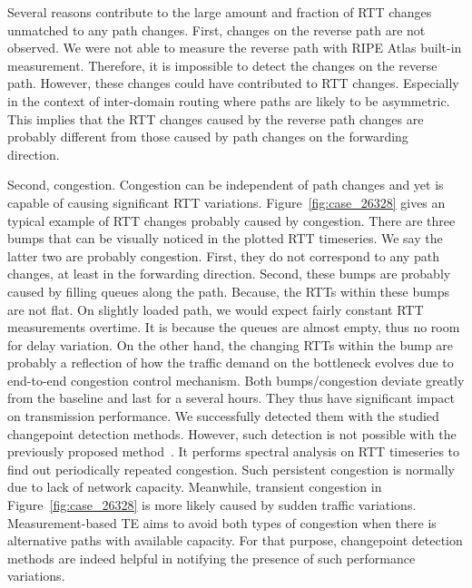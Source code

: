 Several reasons contribute to the large amount and fraction of RTT changes unmatched to any path changes.
First, changes on the reverse path are not observed. 
We were not able to measure the reverse path with RIPE Atlas built-in measurement.
Therefore, it is impossible to detect the changes on the reverse path. 
However, these changes could have contributed to RTT changes. 
Especially in the context of inter-domain routing where paths are likely to be asymmetric.
This implies that the RTT changes caused by the reverse path changes are probably different from those caused by path changes on the forwarding direction.

Second, congestion. 
Congestion can be independent of path changes and yet is capable of causing significant RTT variations.
Figure~\ref{fig:case_26328} gives an typical example of RTT changes probably caused by congestion.
There are three bumps that can be visually noticed in the plotted RTT timeseries.
We say the latter two are probably congestion.
First, they do not correspond to any path changes, at least in the forwarding direction.
Second, these bumps are probably caused by filling queues along the path.
Because, the RTTs within these bumps are not flat.
On slightly loaded path, we would expect fairly constant RTT measurements overtime.
It is because the queues are almost empty, thus no room for delay variation.
On the other hand, the changing RTTs within the bump are probably a reflection of how the traffic demand on the bottleneck evolves due to end-to-end congestion control mechanism.
Both bumps/congestion deviate greatly from the baseline and last for a several hours.
They thus have significant impact on transmission performance.
We successfully detected them with the studied changepoint detection methods.
However, such detection is not possible with the previously proposed method~\cite{Luckie2014}.
It performs spectral analysis on RTT timeseries to find out periodically repeated congestion.
Such persistent congestion is normally due to lack of network capacity.
Meanwhile, transient congestion in Figure~\ref{fig:case_26328} is more likely caused by sudden traffic variations.
Measurement-based TE aims to avoid both types of congestion when there is alternative paths with available capacity.
For that purpose, changepoint detection methods are indeed helpful in notifying the presence of such performance variations. 

